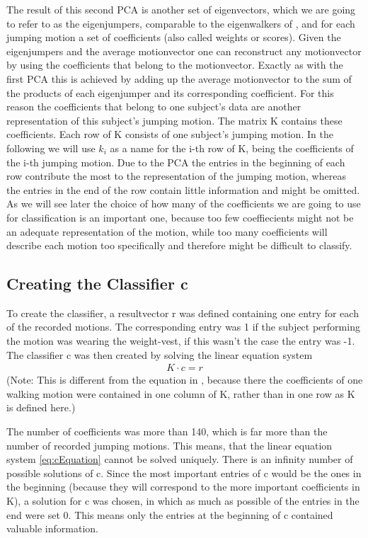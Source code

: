 \documentclass[a4paper]{article}
\begin{document}
The result of this second PCA is another set of eigenvectors, which we are going to refer to as the eigenjumpers, comparable to the eigenwalkers of \cite{origin}, and for each jumping motion a set of coefficients (also called weights or scores).
Given the eigenjumpers and the average motionvector one can reconstruct any motionvector by using the coefficients that belong to the motionvector. Exactly as with the first PCA this is achieved by adding up the average motionvector to the sum of the products of each eigenjumper and its corresponding coefficient.
For this reason the coefficients that belong to one subject's data are another representation of this subject's jumping motion.
The matrix K contains these coefficients. Each row of K consists of one subject's jumping motion. In the following we will use $k_{i}$ as a name for the i-th row of K, being the coefficients of the i-th jumping motion.
Due to the PCA the entries in the beginning of each row contribute the most to the representation of the jumping motion, whereas the entries in the end of the row contain little information and might be omitted.
As we will see later the choice of how many of the coefficients we are going to use for classification is an important one, because too few coeffiecients might not be an adequate representation of the motion, while too many coefficients will describe each motion too specifically and therefore might be difficult to classify.

\subsection{Creating the Classifier c}

To create the classifier, a resultvector r was defined containing one entry for each of the recorded motions. The corresponding entry was 1 if the subject performing the motion was wearing the weight-vest, if this wasn't the case the entry was -1. The classifier c was then created by solving the linear equation system
\begin{align}
	K \cdot c=r \label{eq:cEquation}
\end{align} 
(Note: This is different from the equation in \cite{origin}, because there the coefficients of one walking motion were contained in one column of K, rather than in one row as K is defined here.)

The number of coefficients was more than 140, which is far more than the number of recorded jumping motions. This means, that the linear equation system \ref{eq:cEquation} cannot be solved uniquely. There is an infinity number of possible solutions of c. Since the most important entries of c would be the ones in the beginning (because they will correspond to the more important coefficients in K), a solution for c was chosen, in which as much as possible of the entries in the end were set 0. This means only the entries at the beginning of c contained valuable information.
\end{document}

